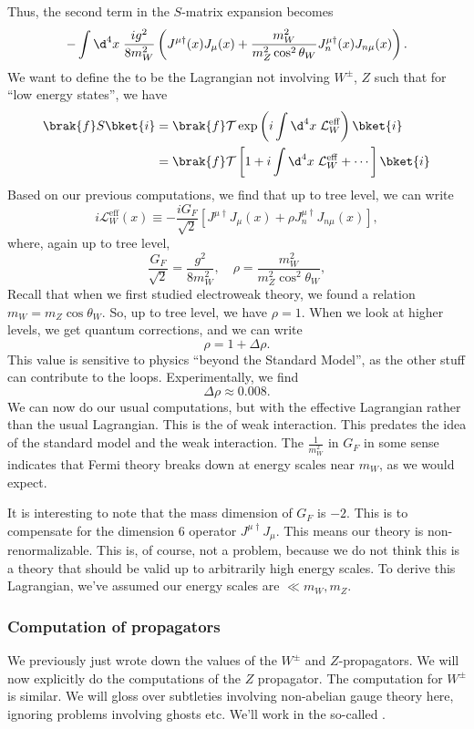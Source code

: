 \documentclass[a4paper]{article}
\begin{document}
Thus, the second term in the $S$-matrix expansion becomes
\[
  -\int \d^4 x\; \frac{ig^2}{8 m_W^2} \left(J^{\mu \dagger}(x) J_\mu(x) + \frac{m_W^2}{m_Z^2 \cos^2 \theta_W} J_n^{\mu\dagger} (x) J_{n\mu} (x)\right).
\]
We want to define the   to be the Lagrangian not involving $W^{\pm}$, $Z$ such that for ``low energy states'', we have
\begin{align*}
  \brak{f}S\bket{i} &= \brak{f} \mathcal{T} \exp\left(i \int \d^4 x\; \mathcal{L}_W^{\mathrm{eff}}\right)\bket{i}\\
  &= \brak{f} \mathcal{T} \left[1 + i \int \d^4 x\; \mathcal{L}_W^{\mathrm{eff}} + \cdots\right] \bket{i}
\end{align*}
Based on our previous computations, we find that up to tree level, we can write
\[
  i \mathcal{L}_W^{\mathrm{eff}} (x) \equiv - \frac{i G_F}{\sqrt{2}} \left[J^{\mu \dagger} J_\mu(x) + \rho J_n^{\mu\dagger} J_{n\mu} (x)\right],
\]
where, again up to tree level,
\[
  \frac{G_F}{\sqrt{2}} = \frac{g^2}{8 m_W^2},\quad \rho = \frac{m_W^2}{m_Z^2 \cos^2 \theta_W},
\]
Recall that when we first studied electroweak theory, we found a relation $m_W= m_Z \cos \theta_W$. So, up to tree level, we have $\rho = 1$. When we look at higher levels, we get quantum corrections, and we can write
\[
  \rho = 1 + \Delta \rho.
\]
This value is sensitive to physics ``beyond the Standard Model'', as the other stuff can contribute to the loops. Experimentally, we find
\[
  \Delta \rho \approx 0.008.
\]
We can now do our usual computations, but with the effective Lagrangian rather than the usual Lagrangian. This is the  of weak interaction. This predates the idea of the standard model and the weak interaction. The $\frac{1}{m_W^2}$ in $G_F$ in some sense indicates that Fermi theory breaks down at energy scales near $m_W$, as we would expect.

It is interesting to note that the mass dimension of $G_F$ is $-2$. This is to compensate for the dimension $6$ operator $J^{\mu\dagger}J_\mu$. This means our theory is non-renormalizable. This is, of course, not a problem, because we do not think this is a theory that should be valid up to arbitrarily high energy scales. To derive this Lagrangian, we've assumed our energy scales are $\ll m_W, m_Z$.

\subsubsection*{Computation of propagators}
We previously just wrote down the values of the $W^{\pm}$ and $Z$-propagators. We will now explicitly do the computations of the $Z$ propagator. The computation for $W^{\pm}$ is similar. We will gloss over subtleties involving non-abelian gauge theory here, ignoring problems involving ghosts etc. We'll work in the so-called .
\end{document}
